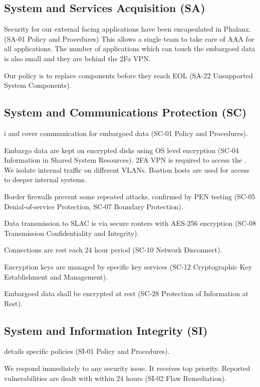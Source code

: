 \subsection{System and Services Acquisition (SA)} \label{sec:SA}
Security for our external facing applications have been encapsulated in Phalanx. (SA-01  Policy and Procedures)
This allows a single team to take care of AAA for all applications.
The number of applications which can touch the embargoed data is also small and they are behind the 2Fa VPN.

Our policy is to replace components before they reach EOL (SA-22  Unsupported System Components).


\subsection{System and Communications Protection (SC)} \label{sec:SC}
i and  cover communication  for embargoed data (SC-01  Policy and Procedures).

Embargo data are kept on encrypted disks using OS level encryption (SC-04  Information in Shared System Resources).
2FA VPN is required to access the \PZ.
We isolate internal traffic on different VLANs.
Bastion hosts are used for access to deeper internal systems.

Border firewalls prevent some repeated attacks, confirmed by PEN testing (SC-05  Denial-of-service Protection, SC-07  Boundary Protection).

Data transmission to SLAC is via  secure routers with AES-256 encryption (SC-08  Transmission Confidentiality and Integrity).

Connections are rest each 24 hour period (SC-10  Network Disconnect).

Encryption keys are managed by specific key services  (SC-12  Cryptographic Key Establishment and Management).

Embargoed data shall be encrypted at rest (SC-28  Protection of Information at Rest).


\subsection{ System and Information Integrity (SI)} \label{sec:SI}
 details specific policies (SI-01  Policy and Procedures).

We respond immediately to any security issue.
It receives top priority.
Reported vulnerabilities are dealt with within 24 hours (SI-02  Flaw Remediation).

